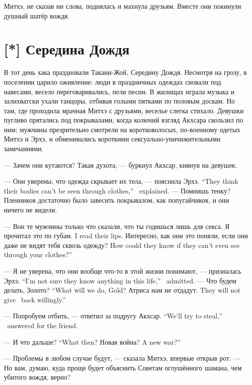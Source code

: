Митхэ, не сказав ни слова, поднялась и махнула друзьям.
Вместе они покинули душный шатёр вождя.

\section{[*] Середина Дождя}

В тот день хака праздновали Такани-Жой, Середину Дождя.
Несмотря на грозу, в поселении царило оживление: люди в праздничных одеждах сновали под навесами, весело переговаривались, пели песни.
В жилищах играла музыка и залихватски ухали танцоры, отбивая голыми пятками по половым доскам.
Но там, где проходила мрачная Митхэ с друзьями, веселье слегка стихало.
Девушки пугливо прятались под покрывалами, когда колючий взгляд Акхсара скользил по ним;
мужчины презрительно смотрели на коротковолосых, по-военному одетых Митхэ и Эрхэ, и обменивались короткими сексуально-уничижительными замечаниями.

--- Зачем они кутаются?
Такая духота, --- буркнул Акхсар, кивнув на девушек.

{--- Они уверены, что одежда скрывает их тела, --- пояснила Эрхэ.}
{``They think their bodies can't be seen through clothes,'' \Oerchoe\ explained.}
--- Помнишь тенку?
Пленников достаточно было завесить покрывалом, как попугайчиков, и они ничего не видели.

--- Вон те мужчины только что сказали, что ты годишься лишь для секса.
{Я прочитал это по губам.}
{I read their lips.}
{Интересно, как они это поняли, если они даже не видят тебя сквозь одежду?}
{How could they know if they can't even see through your clothes?''}

{--- Я не уверена, что они вообще что-то в этой жизни понимают, --- призналась Эрхэ.}
{``I'm not sure they know anything in this life,'' \Oerchoe\ admitted.}
{--- Что будем делать, Золото?}
{``What will we do, Gold?}
{Атриса нам не отдадут.}
{They will not give \Aatris\ back willingly.''}

{--- Попробуем отбить, --- ответил за подругу Акхсар.}
{``We'll try to steal,'' \Akchsar\ answered for the friend.}

{--- И что дальше?}
{``What then?}
{Новая война?}
{A new war?''}

--- Проблемы в любом случае будут, --- сказала Митхэ, впервые открыв рот.
--- Но вам, думаю, куда проще будет объяснить Советам оглушённого шамана, чем убитого вождя, верно?

